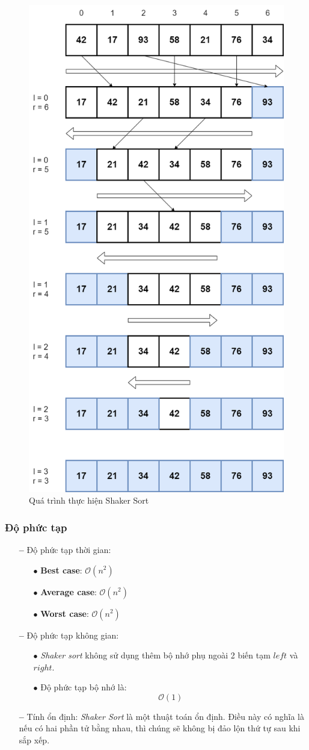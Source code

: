 \begin{figure}[H]
    \centering
    \includegraphics[width=0.6\linewidth]{img/shaker_sort/1.png}
    \caption{Quá trình thực hiện Shaker Sort}
\end{figure}

\subsubsection{Độ phức tạp}

\begin{itemize}
    \item[\textbf{--}] Độ phức tạp thời gian: 
    \begin{itemize}
        \item[$\bullet$] \textbf{Best case}: $\mathcal{O}(n^2)$
        \item[$\bullet$] \textbf{Average case}: $\mathcal{O}(n^2)$
        \item[$\bullet$] \textbf{Worst case}: $\mathcal{O}(n^2)$
    \end{itemize}
    \item[\textbf{--}] Độ phức tạp không gian:
    \begin{itemize}
        \item[$\bullet$] \textit{Shaker sort} không sử dụng thêm bộ nhớ phụ ngoài 2 biến tạm $left$ và $right$.
        \item[$\bullet$] Độ phức tạp bộ nhớ là:
        \[
        \mathcal{O}(1)
        \]
    \end{itemize}
    \item[\textbf{--}] Tính ổn định: \textit{Shaker Sort} là một thuật toán ổn định. Điều này có nghĩa là nếu có hai phần tử bằng nhau, thì chúng sẽ không bị đảo lộn thứ tự sau khi sắp xếp.
\end{itemize}
